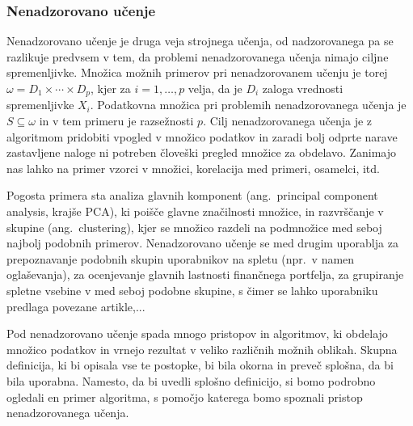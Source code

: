 \documentclass[12pt,a4paper]{article}
\begin{document}


\subsubsection{Nenadzorovano učenje}

Nenadzorovano učenje je druga veja strojnega učenja, od nadzorovanega pa se razlikuje predvsem v tem, da problemi nenadzorovanega učenja nimajo ciljne spremenljivke. 
Množica možnih primerov pri nenadzorovanem učenju je torej $\omega = D_1 \times \cdots \times D_p$, kjer za $i= 1,\ldots, p$ velja, da je $D_i$ zaloga vrednosti spremenljivke $X_i$. 
Podatkovna množica pri problemih nenadzorovanega učenja je $S \subseteq \omega$ in v tem primeru je razsežnosti $p$. 
Cilj nenadzorovanega učenja je z algoritmom pridobiti vpogled v množico podatkov in zaradi bolj odprte narave zastavljene naloge ni potreben človeški pregled množice za obdelavo. 
Zanimajo nas lahko na primer vzorci v množici, korelacija med primeri, osamelci, itd.

Pogosta primera sta analiza glavnih komponent (ang.~principal component analysis, krajše PCA), ki poišče glavne značilnosti množice, 
in razvrščanje v skupine (ang.~clustering), kjer se množico razdeli na podmnožice med seboj najbolj podobnih primerov. 
Nenadzorovano učenje se med drugim uporablja za prepoznavanje podobnih skupin uporabnikov na spletu (npr.\ v namen oglaševanja), 
za ocenjevanje glavnih lastnosti finančnega portfelja, za grupiranje spletne vsebine v med seboj podobne skupine, s čimer se lahko uporabniku predlaga povezane artikle,...

Pod nenadzorovano učenje spada mnogo pristopov in algoritmov, ki obdelajo množico podatkov in vrnejo rezultat v veliko različnih možnih oblikah. Skupna definicija, ki bi opisala vse te postopke, bi bila okorna in preveč splošna, da bi bila uporabna. Namesto, da bi uvedli splošno definicijo, si bomo podrobno ogledali en primer algoritma, s pomočjo katerega bomo spoznali pristop nenadzorovanega učenja.
\end{document}
